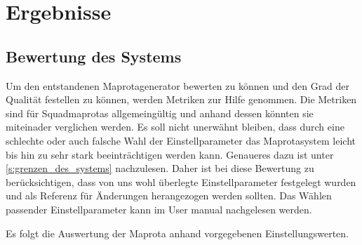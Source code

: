 \section{Ergebnisse}
    
    \subsection{Bewertung des Systems}
        \label{sec:bewerten_des_systems}
        Um den entstandenen Maprotagenerator bewerten zu können und den Grad der Qualität festellen zu können, 
        werden Metriken zur Hilfe genommen. Die Metriken sind für Squadmaprotas
        allgemeingültig und anhand dessen könnten sie miteinader verglichen werden. Es soll nicht unerwähnt bleiben,
        dass durch eine schlechte oder auch falsche Wahl der Einstellparameter das Maprotasystem leicht bis hin zu 
        sehr stark beeinträchtigen werden kann. Genaueres dazu ist unter \ref{s:grenzen_des_systems} nachzulesen.
        Daher ist bei diese Bewertung zu berücksichtigen, dass von uns wohl überlegte Einstellparameter festgelegt wurden
        und als Referenz für Änderungen herangezogen werden sollten.
        Das Wählen passender Einstellparameter kann im User manual nachgelesen werden.
   
        Es folgt die Auswertung der Maprota anhand vorgegebenen Einstellungswerten.\\

